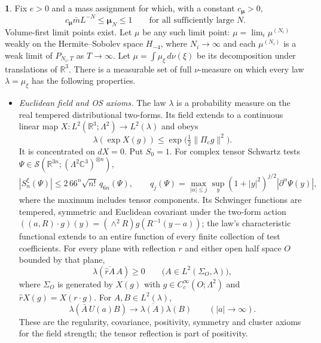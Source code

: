\documentclass[11pt]{amsart}
\newcommand{\namedhead}{}
\theoremstyle{definition}
\newtheorem*{namedinner}{\namedhead}
\newenvironment{named}[1]{\renewcommand{\namedhead}{#1}\begin{namedinner}}{\end{namedinner}}
\begin{document}
\begin{named}{Theorem A}
Fix $e>0$ and a mass assignment for which, with a constant
$c_{\boldsymbol\mu}>0$,
\[
c_{\boldsymbol\mu}\bar mL^{-N}\le\boldsymbol\mu_N\le1
\qquad\text{for all sufficiently large }N.
\]
Volume-first limit points exist. Let $\mu$ be any such limit point:
$\mu=\lim_i\mu^{(N_i)}$ weakly on the Hermite--Sobolev space $H_{-4}$,
where $N_i\to\infty$ and each $\mu^{(N_i)}$ is a weak limit of
$P_{N_i,T}$ as $T\to\infty$.
Let $\mu=\int\mu_\xi\,d\nu(\xi)$ be its decomposition under translations
of $\mathbb R^3$. There is a measurable set of full $\nu$-measure on
which every law $\lambda=\mu_\xi$ has the following properties.

\begin{itemize}
\item[(i)] \emph{Euclidean field and OS axioms.}
The law $\lambda$ is a probability measure on the real tempered
distributional two-forms. Its field extends to a continuous linear map
$X:L^2(\mathbb R^3;\Lambda^2)\to L^2(\lambda)$ and obeys
\[
\lambda(\exp X(g))\le\exp\bigl(\tfrac12\|\Pi_{\mathrm c}g\|^2\bigr).
\]
It is concentrated on $dX=0$. Put $S_0=1$. For complex tensor Schwartz
tests $\Psi\in\mathcal S(\mathbb R^{3n};(\Lambda^2\mathbb C^3)^{\otimes n})$,
\[
|S_n^\xi(\Psi)|\le2\,66^n\sqrt{n!}\,q_{6n}(\Psi),\qquad
q_j(\Psi)=\max_{|\alpha|\le j}\sup_y(1+|y|^2)^{j/2}|\partial^\alpha\Psi(y)|,
\]
where the maximum includes tensor components.
Its Schwinger functions are tempered,
symmetric and Euclidean covariant under the two-form action
$((a,R)\cdot g)(y)=(\wedge^2R)g(R^{-1}(y-a))$;
the law's characteristic functional extends to an entire function of every
finite collection of test coefficients.
For every plane with reflection $r$ and either open half space $O$ bounded by that plane,
\[
\lambda(\overline{\widehat r A}\,A)\ge0
\qquad\bigl(A\in L^2(\Sigma_O,\lambda)\bigr),
\]
where $\Sigma_O$ is generated by $X(g)$ with
$g\in C_c^\infty(O;\Lambda^2)$ and
$\widehat r X(g)=X(r\cdot g)$.
For $A,B\in L^2(\lambda)$,
\[
\lambda(\bar A\,U(a)B)\longrightarrow
\overline{\lambda(A)}\lambda(B)\qquad(|a|\to\infty).
\]
These are the regularity, covariance, positivity, symmetry and cluster
axioms for the field strength; the tensor reflection is part of positivity.


\end{itemize}
\end{named}
\end{document}
